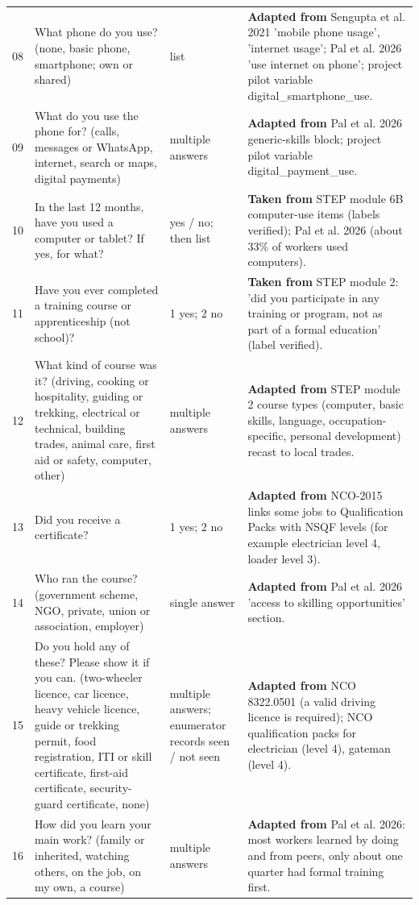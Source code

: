\documentclass[11pt]{article}
\begin{document}
{\begin{longtable}{p{0.7cm}p{4.5cm}p{2.8cm}p{6.6cm}}
08 & What phone do you use? (none, basic phone, smartphone; own or shared) & list & \textbf{Adapted from} Sengupta et al. 2021 'mobile phone usage', 'internet usage'; Pal et al. 2026 'use internet on phone'; project pilot variable digital\_smartphone\_use. \\
09 & What do you use the phone for? (calls, messages or WhatsApp, internet, search or maps, digital payments) & multiple answers & \textbf{Adapted from} Pal et al. 2026 generic-skills block; project pilot variable digital\_payment\_use. \\
10 & In the last 12 months, have you used a computer or tablet? If yes, for what? & yes / no; then list & \textbf{Taken from} STEP module 6B computer-use items (labels verified); Pal et al. 2026 (about 33\% of workers used computers). \\
11 & Have you ever completed a training course or apprenticeship (not school)? & 1 yes; 2 no & \textbf{Taken from} STEP module 2: 'did you participate in any training or program, not as part of a formal education' (label verified). \\
12 & What kind of course was it? (driving, cooking or hospitality, guiding or trekking, electrical or technical, building trades, animal care, first aid or safety, computer, other) & multiple answers & \textbf{Adapted from} STEP module 2 course types (computer, basic skills, language, occupation-specific, personal development) recast to local trades. \\
13 & Did you receive a certificate? & 1 yes; 2 no & \textbf{Adapted from} NCO-2015 links some jobs to Qualification Packs with NSQF levels (for example electrician level 4, loader level 3). \\
14 & Who ran the course? (government scheme, NGO, private, union or association, employer) & single answer & \textbf{Adapted from} Pal et al. 2026 'access to skilling opportunities' section. \\
15 & Do you hold any of these? Please show it if you can. (two-wheeler licence, car licence, heavy vehicle licence, guide or trekking permit, food registration, ITI or skill certificate, first-aid certificate, security-guard certificate, none) & multiple answers; enumerator records seen / not seen & \textbf{Adapted from} NCO 8322.0501 (a valid driving licence is required); NCO qualification packs for electrician (level 4), gateman (level 4). \\
16 & How did you learn your main work? (family or inherited, watching others, on the job, on my own, a course) & multiple answers & \textbf{Adapted from} Pal et al. 2026: most workers learned by doing and from peers, only about one quarter had formal training first. \\
\bottomrule
\end{longtable}
}
\end{document}
